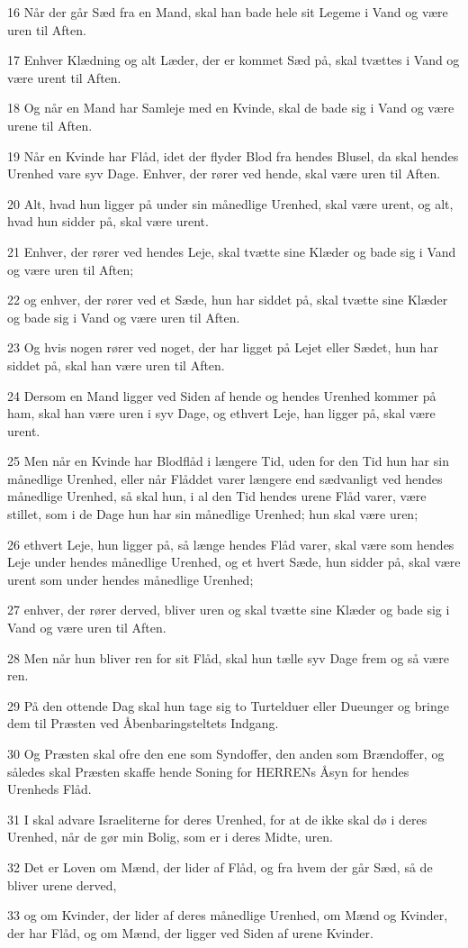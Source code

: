 \par 16 Når der går Sæd fra en Mand, skal han bade hele sit Legeme i Vand og være uren til Aften.
\par 17 Enhver Klædning og alt Læder, der er kommet Sæd på, skal tvættes i Vand og være urent til Aften.
\par 18 Og når en Mand har Samleje med en Kvinde, skal de bade sig i Vand og være urene til Aften.
\par 19 Når en Kvinde har Flåd, idet der flyder Blod fra hendes Blusel, da skal hendes Urenhed vare syv Dage. Enhver, der rører ved hende, skal være uren til Aften.
\par 20 Alt, hvad hun ligger på under sin månedlige Urenhed, skal være urent, og alt, hvad hun sidder på, skal være urent.
\par 21 Enhver, der rører ved hendes Leje, skal tvætte sine Klæder og bade sig i Vand og være uren til Aften;
\par 22 og enhver, der rører ved et Sæde, hun har siddet på, skal tvætte sine Klæder og bade sig i Vand og være uren til Aften.
\par 23 Og hvis nogen rører ved noget, der har ligget på Lejet eller Sædet, hun har siddet på, skal han være uren til Aften.
\par 24 Dersom en Mand ligger ved Siden af hende og hendes Urenhed kommer på ham, skal han være uren i syv Dage, og ethvert Leje, han ligger på, skal være urent.
\par 25 Men når en Kvinde har Blodflåd i længere Tid, uden for den Tid hun har sin månedlige Urenhed, eller når Flåddet varer længere end sædvanligt ved hendes månedlige Urenhed, så skal hun, i al den Tid hendes urene Flåd varer, være stillet, som i de Dage hun har sin månedlige Urenhed; hun skal være uren;
\par 26 ethvert Leje, hun ligger på, så længe hendes Flåd varer, skal være som hendes Leje under hendes månedlige Urenhed, og et hvert Sæde, hun sidder på, skal være urent som under hendes månedlige Urenhed;
\par 27 enhver, der rører derved, bliver uren og skal tvætte sine Klæder og bade sig i Vand og være uren til Aften.
\par 28 Men når hun bliver ren for sit Flåd, skal hun tælle syv Dage frem og så være ren.
\par 29 På den ottende Dag skal hun tage sig to Turtelduer eller Dueunger og bringe dem til Præsten ved Åbenbaringsteltets Indgang.
\par 30 Og Præsten skal ofre den ene som Syndoffer, den anden som Brændoffer, og således skal Præsten skaffe hende Soning for HERRENs Åsyn for hendes Urenheds Flåd.
\par 31 I skal advare Israeliterne for deres Urenhed, for at de ikke skal dø i deres Urenhed, når de gør min Bolig, som er i deres Midte, uren.
\par 32 Det er Loven om Mænd, der lider af Flåd, og fra hvem der går Sæd, så de bliver urene derved,
\par 33 og om Kvinder, der lider af deres månedlige Urenhed, om Mænd og Kvinder, der har Flåd, og om Mænd, der ligger ved Siden af urene Kvinder.

